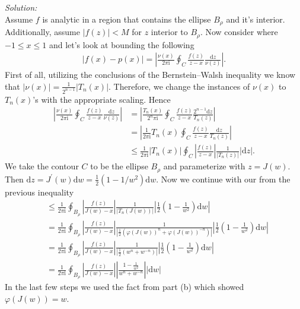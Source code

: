 \documentclass[10pt]{amsart}
\newcommand{\D}{\mathrm{d}}
\newcommand{\I}{\mathrm{i}}
\theoremstyle{nonumberplain}
\begin{document}
\begin{enumerate}[label={\bf {\arabic*}:}]
\begin{enumerate}
\noindent
\textit{Solution:} \\
Assume $f$ is analytic in a region that contains the ellipse $B_\rho$ and it's interior.
Additionally, assume $|f(z)| < M$ for $z$ interior to $B_\rho$.
Now consider where $-1 \leq x \leq 1$ and let's look at bounding the following
\begin{align*}
|f(x) - p(x)| = \left| \frac{\nu(x)}{2 \pi \I} \oint_C \frac{f(z)}{z - x}
	\frac{\D z}{\nu(z)} \right|.
\end{align*}
First of all, utilizing the conclusions of the Bernstein–Walsh inequality we know that $|\nu(x)| = \frac 1 {2^{n - 1}} |T_n(x)|$.
Therefore, we change the instances of $\nu(x)$ to $T_n(x)$'s with the appropriate scaling.
Hence
\begin{align*}
\left| \frac{\nu(x)}{2 \pi \I} \oint_C \frac{f(z)}{z - x} \frac{\D z}{\nu(z)} \right|
	&= \left| \frac{T_n(x)}{2^n \pi \I} \oint_C \frac{f(z)}{z - x} \frac{2^{n - 1}\D z}{T_n(z)} \right| \\
	&= \left| \frac 1 {2 \pi \I} T_n(x) \oint_C \frac{ f(z)}{z - x} \frac{\D z}{T_n(z)} \right| \\
	&\leq \frac 1 {2 \pi \I} |T_n(x)| \oint_C \left| \frac{ f(z)}{z - x} \right| \frac 1 {|T_n(z)|} |\D z|.
\end{align*}
We take the contour $C$ to be the ellipse $B_\rho$ and parameterize with $z = J(w)$.
Then $\D z = J^\prime(w) \D w = \frac 1 2 (1 - 1/w^2) \D w$.
Now we continue with our from the previous inequality
\begin{align*}
&\leq \frac 1 {2 \pi \I}
	\oint_{B_\rho}
		\left| \frac{ f(z)}{J(w) - x} \right|
		\frac 1 {|T_n(J(w))|}
		\left|\frac 1 2 \left(1 - \frac 1 {w^2} \right) \D w \right| \\
&= \frac 1 {2 \pi \I}
	\oint_{B_\rho}
		\left| \frac{ f(z)}{J(w) - x} \right|
		\frac 1  {\left| \frac 1 2 \left( \varphi(J(w))^n + \varphi(J(w))^{-n} \right) \right|}
		\left|\frac 1 2 \left(1 - \frac 1 {w^2} \right) \D w \right| \\
&= \frac 1 {2 \pi \I}
	\oint_{B_\rho}
		\left| \frac{ f(z)}{J(w) - x} \right|
		\frac 1  {\left| \frac 1 2 \left( w^n + w^{-n} \right) \right|}
		\left|\frac 1 2 \left(1 - \frac 1 {w^2} \right) \D w \right| \\
&= \frac 1 {2 \pi \I}
	\oint_{B_\rho}
		\left| \frac{ f(z)}{J(w) - x} \right|
		\left| \frac {1 - \frac 1 {w^2}}  { w^n + w^{-n} } \right|
		|\D w|
\end{align*}
In the last few steps we used the fact from part (b) which showed $\varphi(J(w)) = w$.

\end{enumerate}
\end{enumerate}
\end{document}
